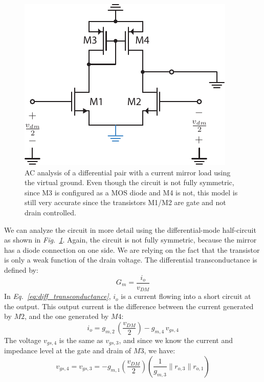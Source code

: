 \begin{figure}[H]
\centering
\includegraphics[scale=1.15]{Diffpair_se_ac_gm} 
\caption{AC analysis of a differential pair with a current mirror load using the virtual ground.  Even though the circuit is not fully symmetric, since M3 is configured as a MOS diode and M4 is not, this model is still very accurate since the transistors M1/M2 are gate and not drain controlled.}
\label{fig:Diffpair_se_ac_gm}
\end{figure}
We can analyze the circuit in more detail using the differential-mode half-circuit as shown in \emph{Fig.~\ref{fig:Diffpair_se_ac_gm}}.  Again, the circuit is not fully symmetric, because the mirror has a diode connection on one side.  We are relying on the fact that the transistor is only a weak function of the drain voltage.  The differential transconductance is defined by:
    \begin{equation}
        G_m = \frac{i_o}{v_{DM}}
        \label{eq:diff_transconductance}
    \end{equation}
In \emph{Eq.~\ref{eq:diff_transconductance}}, $i_o$ is a current flowing into a short circuit at the output.  This output current is the difference between the current generated by $M2$, and the one generated by $M4$:
    \begin{equation}
        i_o = g_{m,2}\,\left(\frac{v_{DM}}{2}\right) - g_{m,4}\,v_{gs,4}
        \label{eq:cmgain_mirror}
    \end{equation}
\newpage
The voltage $v_{gs,4}$ is the same as $v_{gs,3}$, and since we know the current and impedance level at the gate and drain of $M3$, we have:
    \begin{equation}
        v_{gs,4} = v_{gs,3} = -g_{m,1}\left(\frac{v_{DM}}{2}\right) \left(\frac{1}{g_{m,3}} \parallel r_{o,3} \parallel r_{o,1}\right)
    \end{equation}
